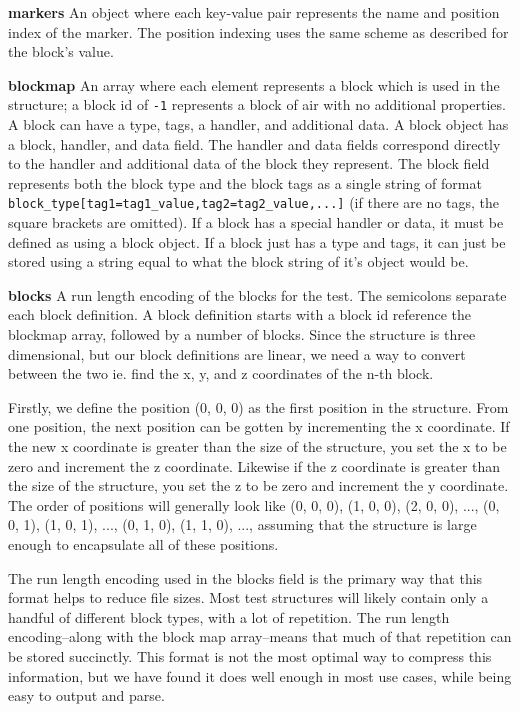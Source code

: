 \documentclass[12pt]{article}
\def\code#1{\texttt{#1}}
\begin{document}
\begin{onehalfspacing}
\noindent\textbf{markers}
An object where each key-value pair represents the name and position
index of the marker. The position indexing uses the same scheme as
described for the block's value.

\noindent\textbf{blockmap}
An array where each element represents a block which is used in the
structure; a block id of \code{-1} represents a block of air with no additional properties.
A block can have a type, tags, a handler, and additional
data. A block object has a block, handler, and data field. The handler
and data fields correspond directly to the handler and additional data
of the block they represent. The block field represents both the block
type and the block tags as a single string of format
\code{block\_type{[}tag1=tag1\_value,tag2=tag2\_value,...{]}} (if there are
no tags, the square brackets are omitted). If a block has a special
handler or data, it must be defined as using a block object. If a block
just has a type and tags, it can just be stored using a string equal to
what the block string of it's object would be.

\noindent\textbf{blocks}
A run length encoding of the blocks for the test. The semicolons
separate each block definition. A block definition starts with a block
id reference the blockmap array, followed by a number of blocks. Since
the structure is three dimensional, but our block definitions are
linear, we need a way to convert between the two ie. find the x, y, and
z coordinates of the n-th block.

Firstly, we define the position (0, 0, 0) as the first position in the
structure. From one position, the next position can be gotten by
incrementing the x coordinate. If the new x coordinate is greater than
the size of the structure, you set the x to be zero and increment the z
coordinate. Likewise if the z coordinate is greater than the size of the
structure, you set the z to be zero and increment the y coordinate. The
order of positions will generally look like (0, 0, 0), (1, 0, 0), (2, 0,
0), ..., (0, 0, 1), (1, 0, 1), ..., (0, 1, 0), (1, 1, 0), ..., assuming
that the structure is large enough to encapsulate all of these
positions.

The run length encoding used in the blocks field is the primary way that
this format helps to reduce file sizes. Most test structures will likely
contain only a handful of different block types, with a lot of
repetition. The run length encoding--along with the block map
array--means that much of that repetition can be stored succinctly. This
format is not the most optimal way to compress this information, but we
have found it does well enough in most use cases, while being easy to
output and parse.


\end{onehalfspacing}
\end{document}
